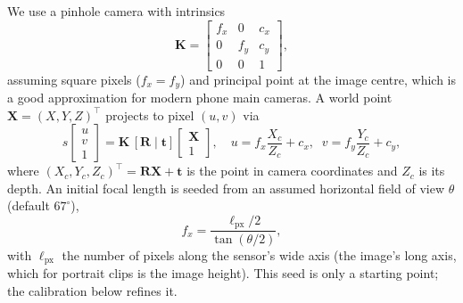 \documentclass[journal]{IEEEtran}
\begin{document}
We use a pinhole camera with intrinsics
\begin{equation}
\mathbf{K}=\begin{bmatrix} f_x & 0 & c_x\\ 0 & f_y & c_y\\ 0 & 0 & 1\end{bmatrix},
\end{equation}
assuming square pixels ($f_x=f_y$) and principal point at the image centre,
which is a good approximation for modern phone main cameras. A world point
$\mathbf{X}=(X,Y,Z)^\top$ projects to pixel $(u,v)$ via
\begin{equation}
s\begin{bmatrix}u\\v\\1\end{bmatrix}
=\mathbf{K}\,[\mathbf{R}\mid\mathbf{t}]\begin{bmatrix}\mathbf{X}\\1\end{bmatrix},
\quad
u=f_x\frac{X_c}{Z_c}+c_x,\;\; v=f_y\frac{Y_c}{Z_c}+c_y,
\label{eq:proj}
\end{equation}
where $(X_c,Y_c,Z_c)^\top=\mathbf{R}\mathbf{X}+\mathbf{t}$ is the point in
camera coordinates and $Z_c$ is its depth. An initial focal length is seeded
from an assumed horizontal field of view $\theta$ (default $67^\circ$),
\begin{equation}
f_x=\frac{\ell_{\text{px}}/2}{\tan(\theta/2)},
\label{eq:focal}
\end{equation}
with $\ell_{\text{px}}$ the number of pixels along the sensor's wide axis (the
image's long axis, which for portrait clips is the image height). This seed is
only a starting point; the calibration below refines it.
\end{document}
